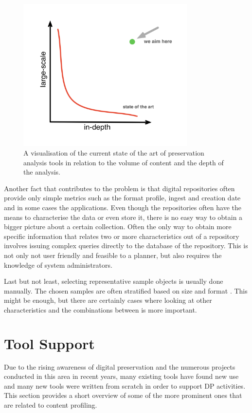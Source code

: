 \begin{figure}[th]
\begin{center}
\includegraphics[width=3.5in]{figures/related/sota_analysis.png}
\caption{A visualisation of the current state of the art of preservation analysis tools in relation to the volume of content and the depth of the analysis.}
\label{fig:sota_analysis}
\end{center}
\end{figure}

Another fact that contributes to the problem is that digital repositories often provide only simple metrics such as the format profile, ingest and creation date and in some cases the applications. Even though the repositories often have the means to characterise the data or even store it, there is no easy way to obtain a bigger picture about a certain collection.
Often the only way to obtain more specific information that relates two or more characteristics out of a repository involves
issuing complex queries directly to the database of the repository. This is not only not user friendly and feasible to a planner, but also requires the knowledge of system administrators.  

Last but not least, selecting representative sample objects is usually done manually. The chosen samples are often stratified based on size and format \cite{journals/dlib/KulovitsRKBBS09}. This might be enough, but there are certainly cases where looking at other characteristics and the combinations between is more important.

\section{Tool Support}
Due to the rising awareness of digital preservation and the numerous projects conducted in this area in recent years, many existing tools have found new use and many new tools were written from scratch in order to support DP activities. This section provides a short overview of some of the more prominent ones that are related to content profiling.

